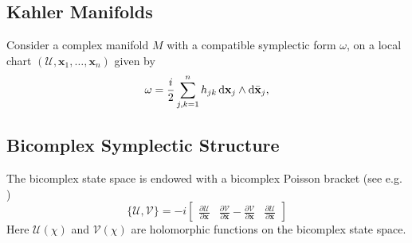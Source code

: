 \subsection{Kahler Manifolds}
\label{sec: kahler}
Consider a complex manifold $M$ with a compatible symplectic form $\omega$, on a local chart $(\mathcal{U}, \textbf{x}_1,\dots,\textbf{x}_n)$ given by
\begin{equation}
    \omega = \frac{i}{2}\sum_{j,k=1}^n h_{jk}\dif \textbf{x}_j \wedge \dif \bar{\textbf{x}}_j,
\end{equation}



\subsection{Bicomplex Symplectic Structure}
\label{sec: struc}
The bicomplex state space is endowed with a bicomplex Poisson bracket (see e.g. \cite{NOVAES2004})
\begin{equation}
\label{eq:PoissonBracket}
\{\mathcal{U},\mathcal{V}\} =
-i \begin{bmatrix}
    \frac{\partial \mathcal{U}}{\partial \textbf{x}}&\frac{\partial \mathcal{V}}{\partial \bar{\textbf{x}}} 
    -
        \frac{\partial \mathcal{V}}{\partial \textbf{x}}&\frac{\partial \mathcal{U}}{\partial \bar{\textbf{x}}} 
    \end{bmatrix}
\end{equation}
Here $\mathcal{U}(\chi)$ and $\mathcal{V}(\chi)$ are holomorphic functions on the bicomplex state space.  




